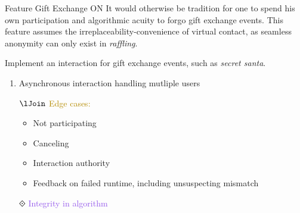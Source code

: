 \documentclass[7px]{article}
\begin{document}
\frontmatter
{Feature}
{Gift Exchange}
{ON}
{It would otherwise be tradition for one to spend his own participation and algorithmic acuity to forgo gift exchange events. This feature assumes the irreplaceability-convenience of virtual contact, as seamless anonymity can only exist in \textsl{raffling}. }

\strategy
{Implement an interaction for gift exchange events, such as \textsl{secret santa}.}
{
  \begin{enumerate}
    \item Asynchronous interaction handling mutliple users
    \item[$\lJoin$] \textcolor[HTML]{B58B00}{Edge cases:}
      \small{
        \begin{itemize}[label=$\multimapdotinv$, leftmargin=1.7mm]
          \item Not participating
          \item Canceling
          \item Interaction authority
          \item Feedback on failed runtime, including unsuspecting mismatch
        \end{itemize}
      }
    \item[$\Diamonddot$] \textcolor[HTML]{9457EB}{Integrity in algorithm}
      \normalsize
    \end{enumerate}
}
\end{document}
